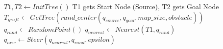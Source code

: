 \documentclass{article}
\begin{document}
\begin{algorithm}
\caption{$graft\_rrt(q_{source}, q_{goal}, map\_size, obstacles, epsilon, threshold, iterations)$}
\begin{algorithmic}[0]
\State $T1,T2 \gets InitTree()$ \Comment T1 gets Start Node (Source), T2 gets Goal Node
\State $T_{graft} \gets GetTree(rand\_center(q_{source}, q_{goal}, map\_size, obstacle))$
	\State $q_{rand} \gets RandomPoint()$
	\State $q_{nearest} \gets Nearest(T1, q_{rand})$
	\State $q_{new} \gets Steer(q_{nearest}, q_{rand}, epsilon)$
	\State 

\EndWhile
\end{algorithmic}
\end{algorithm}
\end{document}
